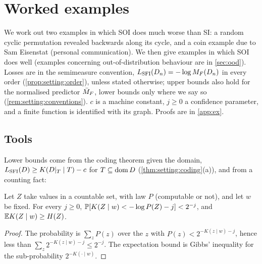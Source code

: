 \section{Worked examples}\label{sec:ex}

We work out two examples in which SOI does much worse than SI: a random cyclic permutation revealed backwards along its cycle, and a coin example due to Sam Eisenstat (personal communication). We then give examples in which SOI does well (examples concerning out-of-distribution behaviour are in \cref{sec:ood}). Losses are in the semimeasure convention, $L_{\mathrm{SFI}}(D_n)=-\log M_{F}(D_n)$ in every order (\cref{prop:setting:order}), unless stated otherwise; upper bounds also hold for the normalised predictor $\bar{M}_{F}$, lower bounds only where we say so (\cref{rem:setting:conventions}). $c$ is a machine constant, $j\ge0$ a confidence parameter, and a finite function is identified with its graph. Proofs are in \cref{app:ex}.

\subsection{Tools}\label{sec:ex:tools}

Lower bounds come from the coding theorem given the domain, $L_{\mathrm{SFI}}(D)\ge K(D|_T\mid T)-c$ for $T\subseteq\operatorname{dom} D$ (\cref{thm:setting:coding}(a)), and from a counting fact:

\begin{lemma}\label{lem:ex:surprisal}
Let $Z$ take values in a countable set, with law $P$ (computable or not), and let $w$ be fixed. For every $j\ge0$, $\mathbb{P}[K(Z\mid w)<-\log P(Z)-j]<2^{-j}$, and $\mathbb{E} K(Z\mid w)\ge H(Z)$.
\end{lemma}

\begin{proof}
The probability is $\sum_zP(z)$ over the $z$ with $P(z)<2^{-K(z\mid w)-j}$, hence less than $\sum_z2^{-K(z\mid w)-j}\le2^{-j}$. The expectation bound is Gibbs' inequality for the sub-probability $2^{-K(\cdot\mid w)}$.
\end{proof}

